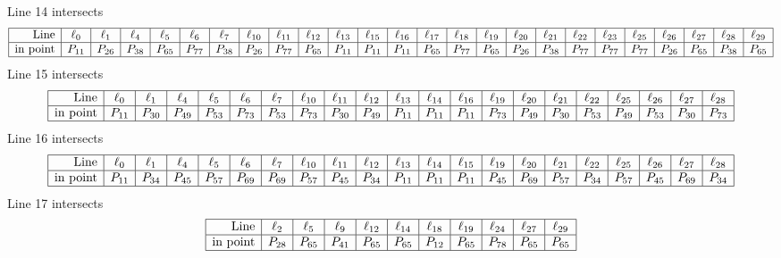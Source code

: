 \documentclass{article}
\begin{document}
{$$$$
Line 14 intersects 
$$
\begin{array}{|r*{24}{|c}|}
\hline
\mbox{Line}  & \ell_{0} & \ell_{1} & \ell_{4} & \ell_{5} & \ell_{6} & \ell_{7} & \ell_{10} & \ell_{11} & \ell_{12} & \ell_{13} & \ell_{15} & \ell_{16} & \ell_{17} & \ell_{18} & \ell_{19} & \ell_{20} & \ell_{21} & \ell_{22} & \ell_{23} & \ell_{25} & \ell_{26} & \ell_{27} & \ell_{28} & \ell_{29}\\
\hline
\mbox{in point}  & P_{11} & P_{26} & P_{38} & P_{65} & P_{77} & P_{38} & P_{26} & P_{77} & P_{65} & P_{11} & P_{11} & P_{11} & P_{65} & P_{77} & P_{65} & P_{26} & P_{38} & P_{77} & P_{77} & P_{77} & P_{26} & P_{65} & P_{38} & P_{65}\\
\hline
\end{array}
$$
Line 15 intersects 
$$
\begin{array}{|r*{20}{|c}|}
\hline
\mbox{Line}  & \ell_{0} & \ell_{1} & \ell_{4} & \ell_{5} & \ell_{6} & \ell_{7} & \ell_{10} & \ell_{11} & \ell_{12} & \ell_{13} & \ell_{14} & \ell_{16} & \ell_{19} & \ell_{20} & \ell_{21} & \ell_{22} & \ell_{25} & \ell_{26} & \ell_{27} & \ell_{28}\\
\hline
\mbox{in point}  & P_{11} & P_{30} & P_{49} & P_{53} & P_{73} & P_{53} & P_{73} & P_{30} & P_{49} & P_{11} & P_{11} & P_{11} & P_{73} & P_{49} & P_{30} & P_{53} & P_{49} & P_{53} & P_{30} & P_{73}\\
\hline
\end{array}
$$
Line 16 intersects 
$$
\begin{array}{|r*{20}{|c}|}
\hline
\mbox{Line}  & \ell_{0} & \ell_{1} & \ell_{4} & \ell_{5} & \ell_{6} & \ell_{7} & \ell_{10} & \ell_{11} & \ell_{12} & \ell_{13} & \ell_{14} & \ell_{15} & \ell_{19} & \ell_{20} & \ell_{21} & \ell_{22} & \ell_{25} & \ell_{26} & \ell_{27} & \ell_{28}\\
\hline
\mbox{in point}  & P_{11} & P_{34} & P_{45} & P_{57} & P_{69} & P_{69} & P_{57} & P_{45} & P_{34} & P_{11} & P_{11} & P_{11} & P_{45} & P_{69} & P_{57} & P_{34} & P_{57} & P_{45} & P_{69} & P_{34}\\
\hline
\end{array}
$$
Line 17 intersects 
$$
\begin{array}{|r*{10}{|c}|}
\hline
\mbox{Line}  & \ell_{2} & \ell_{5} & \ell_{9} & \ell_{12} & \ell_{14} & \ell_{18} & \ell_{19} & \ell_{24} & \ell_{27} & \ell_{29}\\
\hline
\mbox{in point}  & P_{28} & P_{65} & P_{41} & P_{65} & P_{65} & P_{12} & P_{65} & P_{78} & P_{65} & P_{65}\\
\hline

\end{array}$$}
\end{document}
